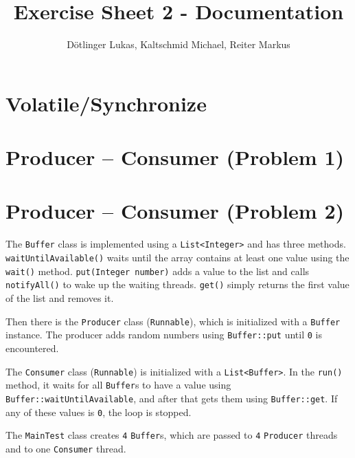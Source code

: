 \documentclass{article}
\begin{document}
	\title{Exercise Sheet 2 - Documentation}
	\date{}
	\author{Dötlinger Lukas, Kaltschmid Michael, Reiter Markus}

	\maketitle

	\section{Volatile/Synchronize}

  \section{Producer – Consumer (Problem 1)}

  \section{Producer – Consumer (Problem 2)}

  The \texttt{Buffer} class is implemented using a \texttt{List<Integer>} and has three methods. \texttt{waitUntilAvailable()} waits until the array contains at least one value using the \texttt{wait()} method. \texttt{put(Integer number)} adds a value to the list and calls \texttt{notifyAll()} to wake up the waiting threads. \texttt{get()} simply returns the first value of the list and removes it.

  Then there is the \texttt{Producer} class (\texttt{Runnable}), which is initialized with a \texttt{Buffer} instance. The producer adds random numbers using \texttt{Buffer::put} until \texttt{0} is encountered.

  The \texttt{Consumer} class (\texttt{Runnable}) is initialized with a \texttt{List<Buffer>}. In the \texttt{run()} method, it waits for all \texttt{Buffer}s to have a value using \texttt{Buffer::waitUntilAvailable}, and after that gets them using \texttt{Buffer::get}. If any of these values is \texttt{0}, the loop is stopped.

  The \texttt{MainTest} class creates \texttt{4} \texttt{Buffer}s, which are passed to \texttt{4} \texttt{Producer} threads and to one \texttt{Consumer} thread.
\end{document}
